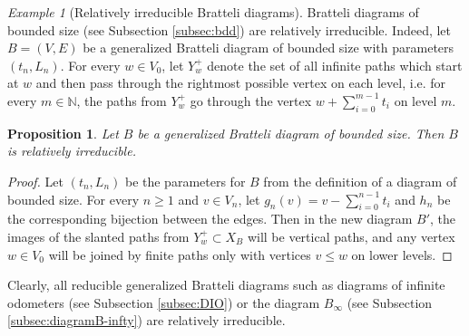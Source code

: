 \documentclass[11pt, twoside]{amsart}
\theoremstyle{definition}
\theoremstyle{remark}
\newtheorem{example}[definition]{Example}
\theoremstyle{plain}
\newtheorem{prop}[definition]{Proposition}
\newcommand{\tcr}{\textcolor{red}}
\numberwithin{equation}{section}
\begin{document}
\begin{example}[Relatively irreducible Bratteli diagrams] Bratteli diagrams of bounded size (see Subsection \ref{subsec:bdd}) are relatively irreducible. 
Indeed, let $B=(V,E)$ be a generalized Bratteli diagram of bounded size  with parameters $(t_n, L_n)$. For every $w \in V_0$, let $Y_w^+$ denote the set of all infinite paths which start at $w$ and then pass through the rightmost possible vertex on each level, i.e. for every $m \in \mathbb{N}$, the paths from $Y_w^+$ go through the vertex $w + \sum_{i = 0}^{m-1} t_i$ on level $m$.


\begin{prop}
    Let $B$ be a generalized Bratteli diagram of bounded size. Then $B$ is relatively irreducible. %
\end{prop}


\begin{proof}
    Let $(t_n,L_n)$ be the parameters for $B$ from the definition of a diagram of bounded size. For every $n \geq 1$ and $v \in V_n$, let $g_n(v) = v - \sum_{i = 0}^{n-1} t_{i}$ and $h_n$ be the corresponding bijection between the edges. Then in the new diagram $B'$, the images of the slanted paths from $Y_w^+ \subset X_B$ will be vertical paths, and any vertex $w \in V_0$ will be joined by finite paths only with vertices $v \leq w$ on lower levels.
\end{proof}

Clearly, all reducible generalized Bratteli diagrams such as diagrams of infinite odometers (see Subsection \ref{subsec:DIO}) or the diagram $B_{\infty}$ (see Subsection \ref{subsec:diagramB-infty}) are relatively irreducible.

\end{example}


\end{document}
